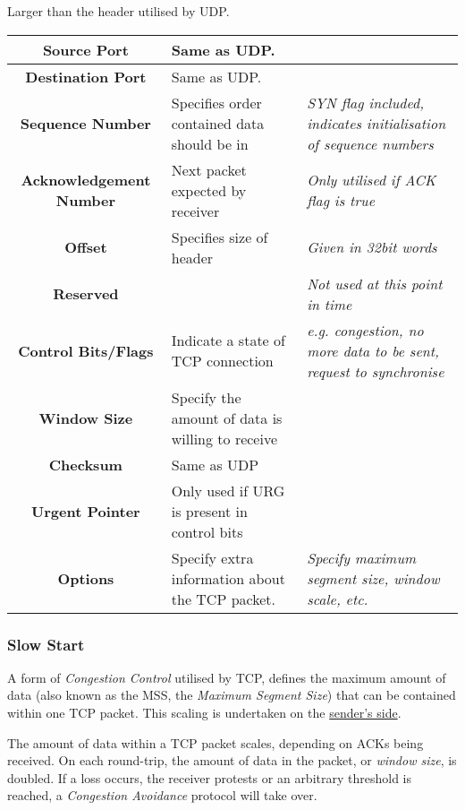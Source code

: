\documentclass{article}
\begin{document}
Larger than the header utilised by UDP.
\begin{center}
  \begin{tabular}{|c|p{4cm}|p{3.5cm}|}
    \hline
    \textbf{Source Port} & Same as UDP. & \\
    \hline
    \textbf{Destination Port} & Same as UDP. & \\
    \hline
    \textbf{Sequence Number} & Specifies order contained data should be in & \textit{SYN flag included, indicates initialisation of sequence numbers}\\
    \hline
    \textbf{Acknowledgement Number} & Next packet expected by receiver & \textit{Only utilised if ACK flag is true}\\
    \hline
    \textbf{Offset} & Specifies size of header & \textit{Given in 32bit words}\\
    \hline
    \textbf{Reserved} & & \textit{Not used at this point in time}\\
    \hline
    \textbf{Control Bits/Flags} & Indicate a state of TCP connection & \textit{e.g. congestion, no more data to be sent, request to synchronise}\\
    \hline
    \textbf{Window Size} & Specify the amount of data is willing to receive & \\
    \hline
    \textbf{Checksum} & Same as UDP & \\
    \hline
    \textbf{Urgent Pointer} & Only used if URG is present in control bits & \\
    \hline
    \textbf{Options} & Specify extra information about the TCP packet. & \textit{Specify maximum segment size, window scale, etc.}\\
    \hline
  \end{tabular}
\end{center}
\filbreak
\subsubsection{Slow Start}

A form of \textit{Congestion Control} utilised by TCP, defines the maximum amount of data (also known as the MSS, the \textit{Maximum Segment Size}) that can be contained within one TCP packet. This scaling is undertaken on the \underline{sender's side}.

 The amount of data within a TCP packet scales, depending on ACKs being received. On each round-trip, the amount of data in the packet, or \textit{window size}, is doubled. If a loss occurs, the receiver protests or an arbitrary threshold is reached, a \textit{Congestion Avoidance} protocol will take over. 
\end{document}
